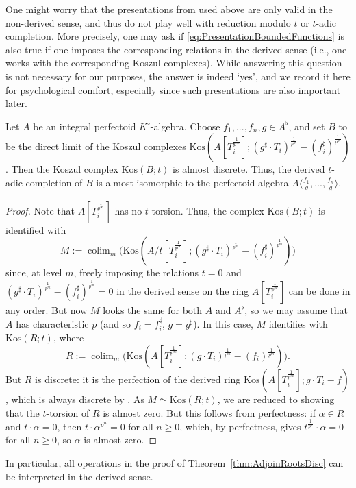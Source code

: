 \documentclass[10pt,reqno]{amsart}
\newcommand{\colim}{\mathop{\mathrm{colim}}}
\begin{document}
\begin{remark}
One might worry that the presentations from \cite[Lemma 6.4]{ScholzePerfectoidSpaces} used above are only valid in the non-derived sense, and thus do not play well with reduction modulo $t$ or $t$-adic completion. More precisely, one may ask if \eqref{eq:PresentationBoundedFunctions} is also true if one imposes the corresponding relations in the derived sense (i.e., one works with the corresponding Koszul complexes). While answering this question is not necessary for our purposes, the answer is indeed `yes', and we record it here for psychological comfort, especially since such presentations are also important later. 

\begin{lemma}
Let $A$ be an integral perfectoid $K^\circ$-algebra. Choose $f_1,...,f_n,g \in A^\flat$, and set $B$ to be the direct limit of the Koszul complexes $\mathrm{Kos}(A[T_i^{\frac{1}{p^\infty}}] ; (g^\sharp \cdot T_i)^{\frac{1}{p^m}} - (f_i^\sharp)^{\frac{1}{p^m}})$. Then the Koszul complex $\mathrm{Kos}(B; t)$ is almost discrete. Thus, the derived $t$-adic completion of $B$ is almost isomorphic to the perfectoid algebra $A \langle \frac{f_1}{g},...,\frac{f_n}{g} \rangle$.
\end{lemma}
\begin{proof}
Note that $A[T_i^{\frac{1}{p^\infty}}]$ has no $t$-torsion. Thus, the complex $\mathrm{Kos}(B; t)$ is identified with 
\[ M := \colim_m \Big(\mathrm{Kos}(A/t[T_i^{\frac{1}{p^\infty}}]; (g^\sharp \cdot T_i)^{\frac{1}{p^m}} - (f_i^\sharp)^{\frac{1}{p^m}})\Big)\]
since, at level $m$, freely imposing the relations $t=0$ and $(g^\sharp \cdot T_i)^{\frac{1}{p^m}} - (f_i^\sharp)^{\frac{1}{p^m}} = 0$ in the derived sense on the ring $A[T_i^{\frac{1}{p^\infty}}]$ can be done in any order. But now $M$ looks the same for both $A$ and $A^\flat$, so we may assume that $A$ has characteristic $p$ (and so $f_i = f_i^\sharp$, $g = g^\sharp$). In this case, $M$ identifies with $\mathrm{Kos}(R; t)$, where 
 \[ R :=  \colim_m \Big(\mathrm{Kos}(A[T_i^{\frac{1}{p^\infty}}]; (g \cdot T_i)^{\frac{1}{p^m}} - (f_i)^{\frac{1}{p^m}})\Big).\]
But $R$ is discrete: it is the perfection of the derived ring $\mathrm{Kos}(A[T_i^{\frac{1}{p^\infty}}]; g \cdot T_i - f)$, which is always discrete by \cite[Lemma 3.16 or Proposition 5.6]{BhattScholzeWitt}. As $M \simeq \mathrm{Kos}(R; t)$, we are reduced to showing that the $t$-torsion of $R$ is almost zero.  But this follows from perfectness: if $\alpha \in R$ and $t \cdot \alpha = 0$, then $t \cdot \alpha^{p^n} = 0$ for all $n \geq 0$, which, by perfectness, gives $t^{\frac{1}{p^n}} \cdot \alpha = 0$ for all $n \geq 0$, so $\alpha$ is almost zero.
\end{proof}
\noindent In particular, all operations in the proof of Theorem~\ref{thm:AdjoinRootsDisc}  can be interpreted in the derived sense. 
\end{remark}
\end{document}
